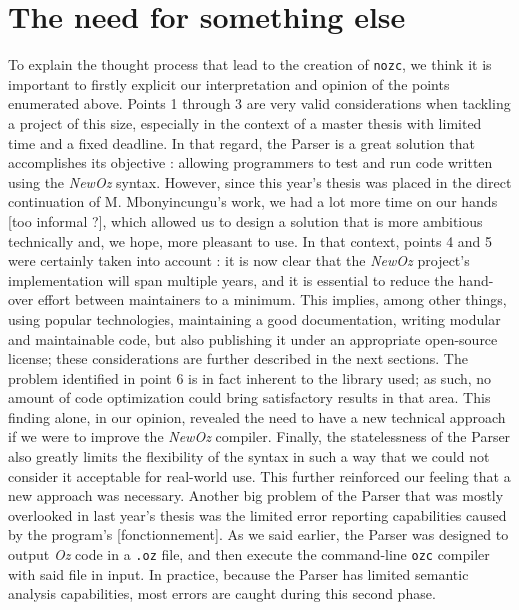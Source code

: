 \section{The need for something else}\label{sec:ch3-problems}
To explain the thought process that lead to the creation of \texttt{nozc}, we think it is important to firstly explicit our interpretation and opinion of the points enumerated above.
Points 1 through 3 are very valid considerations when tackling a project of this size, especially in the context of a master thesis with limited time and a fixed deadline.
In that regard, the Parser is a great solution that accomplishes its objective : allowing programmers to test and run code written using the \textit{NewOz} syntax.\newline
However, since this year's thesis was placed in the direct continuation of M. Mbonyincungu's work, we had a lot more time on our hands [too informal ?], which allowed us to design a solution that is more ambitious technically and, we hope, more pleasant to use.
In that context, points 4 and 5 were certainly taken into account : it is now clear that the \textit{NewOz} project's implementation will span multiple years, and it is essential to reduce the hand-over effort between maintainers to a minimum.
This implies, among other things, using popular technologies, maintaining a good documentation, writing modular and maintainable code, but also publishing it under an appropriate open-source license;
these considerations are further described in the next sections.\newline
The problem identified in point 6 is in fact inherent to the library used;
as such, no amount of code optimization could bring satisfactory results in that area.
This finding alone, in our opinion, revealed the need to have a new technical approach if we were to improve the \textit{NewOz} compiler.\newline
Finally, the statelessness of the Parser also greatly limits the flexibility of the syntax in such a way that we could not consider it acceptable for real-world use.
This further reinforced our feeling that a new approach was necessary.\newline
Another big problem of the Parser that was mostly overlooked in last year's thesis was the limited error reporting capabilities caused by the program's [fonctionnement].
As we said earlier, the Parser was designed to output \textit{Oz} code in a \texttt{.oz} file, and then execute the command-line \texttt{ozc} compiler with said file in input.
In practice, because the Parser has limited semantic analysis capabilities, most errors are caught during this second phase.
